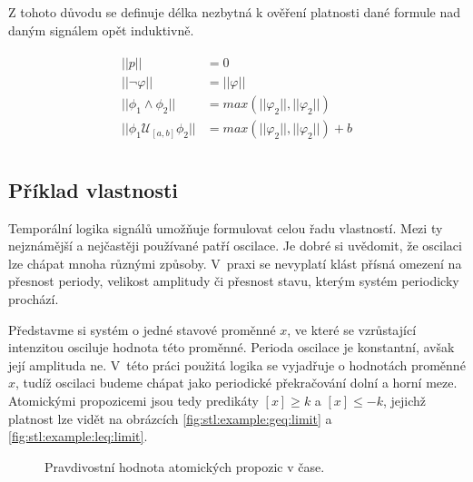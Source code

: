 Z tohoto důvodu se definuje délka nezbytná k ověření platnosti dané formule nad daným signálem
opět induktivně.

\begin{align}\label{eq:stl:min:length}
\begin{array}{ll}
||p||									&= 0									\\
||\neg\varphi||							&= ||\varphi||							\\
||\phi_1 \wedge \phi_2||				&= max(||\varphi_2||,||\varphi_2||) 	\\
||\phi_1 \mathcal{U}_{[a,b]} \phi_2||	&= max(||\varphi_2||,||\varphi_2||) + b	\\
\end{array}
\end{align}

\subsection{Příklad vlastnosti}\label{section:stl:example}

Temporální logika signálů umožňuje formulovat celou řadu vlastností. Me\-zi ty
nejznámější a nejčastěji používané patří oscilace. Je dobré si u\-vě\-do\-mit, že oscilaci
lze chápat mnoha různými způsoby. V~praxi se nevyplatí klást přísná omezení na přesnost
periody, velikost amplitudy či přesnost stavu, kterým systém periodicky prochází. 

Představme si systém o jedné stavové proměnné $x$, ve které se vzrů\-sta\-jí\-cí intenzitou
osciluje hodnota této proměnné. Perioda oscilace je konstantní, avšak její amplituda ne. V~této práci
použitá logika se vyjadřuje o hodnotách proměnné $x$, tudíž oscilaci budeme
chápat jako periodické pře\-kra\-čo\-vá\-ní dolní a horní meze. Atomickými propozicemi jsou tedy
predikáty $[x] \geq k$ a $[x] \leq -k$, jejichž platnost lze vidět na obrázcích
\ref{fig:stl:example:geq:limit} a \ref{fig:stl:example:leq:limit}.

\begin{figure}[t]
\begin{center}
\caption{Pravdivostní hodnota atomických propozic v čase.}
\end{center}
\end{figure}

